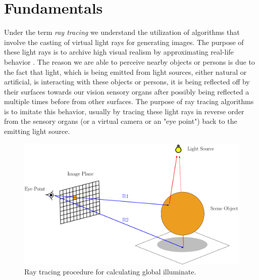 \chapter{Fundamentals}
\label{chap:refs}

Under the term \emph{ray tracing} we understand the utilization of algorithms that involve the casting of virtual light rays for generating images. The purpose of these light rays is to archive high visual realism by approximating real-life behavior . The reason we are able to perceive nearby objects or persons is due to the fact that light, which is being emitted from light sources, either natural or artificial, is interacting with these objects or persons, it is being reflected off by their surfaces towards our vision sensory organs after possibly being reflected a multiple times before from other surfaces. 
The purpose of ray tracing algorithms is to imitate this behavior, usually by tracing these light rays in reverse order from the sensory organs (or a virtual camera or an "eye point") back to the emitting light source.

\begin{figure}[h]
	\centering
	\includegraphics[width=.9\linewidth]{img/1 fundamentals/ray_tracing.png}
	\caption{Ray tracing procedure for calculating global illuminate.}
	\label{fig:raytracer_general}
\end{figure}

